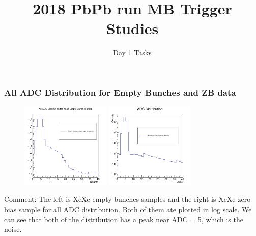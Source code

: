 \documentclass{beamer}
\begin{document}
\title{2018 PbPb run MB Trigger Studies}
\subtitle{Day 1 Tasks}

\begin{frame}
\frametitle{All ADC Distribution for Empty Bunches and ZB data}


\begin{figure}
\includegraphics[width=0.38\textwidth]{Plots/AllEMBXADCDisLog.png}
\includegraphics[width=0.38\textwidth]{Plots/AllZBADCDisLog.png}
\end{figure}

\begin{block}
{Comment: The left is XeXe empty bunches samples and the right is XeXe zero bias sample for all ADC distribution. Both of them ate plotted in log scale. We can see that both of the distribution has a peak near ADC = 5, which is the noise.}
\end{block}

\end{frame}
\end{document}
